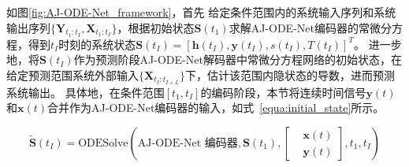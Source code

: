 如图\ref{fig:AJ-ODE-Net_framework}，首先
给定条件范围内的系统输入序列和系统输出序列$\{{\boldsymbol{Y}}_{t_{1}:t_{I}}, {\boldsymbol {X}}_{t_{1}:t_{I}}\}$，根据初始状态$\boldsymbol S(t_1)$求解AJ-ODE-Net编码器的常微分方程，得到$t_I$时刻的系统状态$\boldsymbol S(t_I)=[\boldsymbol h(t_I), \boldsymbol y(t_I), s(t_I), T(t_I)]^T$。
进一步地，将$\boldsymbol S(t_I)$作为预测阶段AJ-ODE-Net解码器中常微分方程网络的初始状态，在给定预测范围系统外部输入$\{{\boldsymbol {X}}_{t_{I}:t_{I+L}}\}$下，估计该范围内隐状态的导数，进而预测系统输出。
具体地，在条件范围$[t_1, t_I]$的编码阶段，本节将连续时间信号$\boldsymbol y(t)$和$\boldsymbol x(t)$合并作为AJ-ODE-Net编码器的输入，如式~\eqref{equa:initial_state}所示。






\begin{equation}
\boldsymbol{\tilde S}(t_I)=\text{ODESolve}(\text{AJ-ODE-Net 编码器},\boldsymbol S(t_1)
, 
\left [
\begin{aligned} 
&\boldsymbol {x}(t) \\
&\boldsymbol {y}(t)
\end{aligned}
\right ]
, t_1, t_I)
\label{equa:initial_state}
\end{equation}

